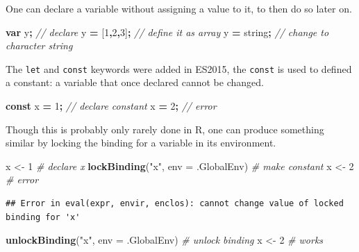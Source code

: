 \documentclass[
]{krantz}
\makeatletter
\newenvironment{Shaded}{\begin{snugshade}}{\end{snugshade}}
\newcommand{\CommentTok}[1]{\textcolor[rgb]{0.37,0.37,0.37}{\textit{#1}}}
\newcommand{\DataTypeTok}[1]{\textcolor[rgb]{0.27,0.27,0.27}{#1}}
\newcommand{\DecValTok}[1]{\textcolor[rgb]{0.06,0.06,0.06}{#1}}
\newcommand{\KeywordTok}[1]{\textcolor[rgb]{0.27,0.27,0.27}{\textbf{#1}}}
\newcommand{\NormalTok}[1]{#1}
\newcommand{\OperatorTok}[1]{\textcolor[rgb]{0.43,0.43,0.43}{\textbf{#1}}}
\newcommand{\StringTok}[1]{\textcolor[rgb]{0.5,0.5,0.5}{#1}}
\newenvironment{kframe}{%
\medskip{}
\setlength{\fboxsep}{.8em}
 \def\at@end@of@kframe{}%
 \ifinner\ifhmode%
  \def\at@end@of@kframe{\end{minipage}}%
  \begin{minipage}{\columnwidth}%
 \fi\fi%
 \def\FrameCommand##1{\hskip\@totalleftmargin \hskip-\fboxsep
 \colorbox{shadecolor}{##1}\hskip-\fboxsep
     \hskip-\linewidth \hskip-\@totalleftmargin \hskip\columnwidth}%
 \MakeFramed {\advance\hsize-\width
   \@totalleftmargin\z@ \linewidth\hsize
   \@setminipage}}%
 {\par\unskip\endMakeFramed%
 \at@end@of@kframe}
\renewenvironment{Shaded}{\begin{kframe}}{\end{kframe}}
\makeatother
\begin{document}
One can declare a variable without assigning a value to it, to then do so later on.

\begin{Shaded}
\begin{Highlighting}[]
\KeywordTok{var}\NormalTok{ y}\OperatorTok{;} \CommentTok{// declare }
\NormalTok{y }\OperatorTok{=}\NormalTok{ [}\DecValTok{1}\OperatorTok{,}\DecValTok{2}\OperatorTok{,}\DecValTok{3}\NormalTok{]}\OperatorTok{;} \CommentTok{// define it as array}
\NormalTok{y }\OperatorTok{=} \StringTok{\textquotesingle{}string\textquotesingle{}}\OperatorTok{;} \CommentTok{// change to character string}
\end{Highlighting}
\end{Shaded}

The \texttt{let} and \texttt{const} keywords were added in ES2015, the \texttt{const} is used to defined a constant: a variable that once declared cannot be changed.

\begin{Shaded}
\begin{Highlighting}[]
\KeywordTok{const}\NormalTok{ x }\OperatorTok{=} \DecValTok{1}\OperatorTok{;} \CommentTok{// declare constant}
\NormalTok{x }\OperatorTok{=} \DecValTok{2}\OperatorTok{;} \CommentTok{// error}
\end{Highlighting}
\end{Shaded}

Though this is probably only rarely done in R, one can produce something similar by locking the binding for a variable in its environment.

\begin{Shaded}
\begin{Highlighting}[]
\NormalTok{x \textless{}{-}}\StringTok{ }\DecValTok{1} \CommentTok{\# declare x}
\KeywordTok{lockBinding}\NormalTok{(}\StringTok{"x"}\NormalTok{, }\DataTypeTok{env =}\NormalTok{ .GlobalEnv) }\CommentTok{\# make constant}
\NormalTok{x \textless{}{-}}\StringTok{ }\DecValTok{2} \CommentTok{\# error}
\end{Highlighting}
\end{Shaded}

\begin{verbatim}
## Error in eval(expr, envir, enclos): cannot change value of locked binding for 'x'
\end{verbatim}

\begin{Shaded}
\begin{Highlighting}[]
\KeywordTok{unlockBinding}\NormalTok{(}\StringTok{"x"}\NormalTok{, }\DataTypeTok{env =}\NormalTok{ .GlobalEnv) }\CommentTok{\# unlock binding}
\NormalTok{x \textless{}{-}}\StringTok{ }\DecValTok{2} \CommentTok{\# works}
\end{Highlighting}
\end{Shaded}
\end{document}

